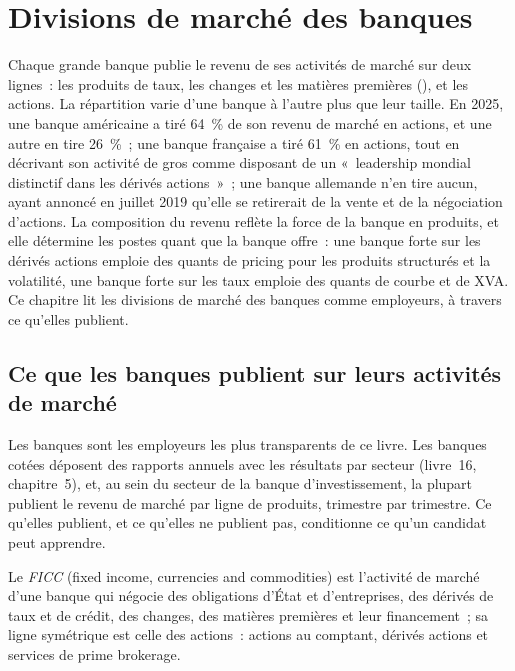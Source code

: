 \chapter{Divisions de marché des banques}\label{ch:in:bank-markets-divisions}

Chaque grande banque publie le revenu de ses activités de marché sur deux lignes~: les produits de taux, les changes et les matières premières (), et les actions.
La répartition varie d'une banque à l'autre plus que leur taille. En 2025, une banque américaine a tiré 64~\% de son revenu de marché en
actions, et une autre en tire 26~\%~; une banque française a tiré 61~\% en actions, tout en décrivant son activité de gros comme disposant de
un «~leadership mondial distinctif dans les dérivés actions~»~; une banque allemande n'en tire aucun, ayant annoncé en juillet 2019
qu'elle se retirerait de la vente et de la négociation d'actions. La composition du revenu reflète la force de la banque en produits, et elle détermine les postes quant que la banque offre~:
une banque forte sur les dérivés actions emploie des quants de pricing pour les produits structurés et la volatilité, une
banque forte sur les taux emploie des quants de courbe et de XVA. Ce chapitre lit les divisions de marché des banques comme employeurs, à travers ce qu'elles
publient.

\section{Ce que les banques publient sur leurs activités de marché}

Les banques sont les employeurs les plus transparents de ce livre. Les banques cotées déposent des rapports annuels avec les résultats par secteur
(livre~16, chapitre~5), et, au sein du secteur de la banque d'investissement, la plupart publient le revenu de marché par ligne de produits, trimestre par
trimestre. Ce qu'elles publient, et ce qu'elles ne publient pas, conditionne ce qu'un candidat peut apprendre.

\begin{definition}[FICC]\label{def:in:bank-markets-divisions:ficc}
Le \emph{FICC} (fixed income, currencies and commodities) est l'activité de marché d'une banque qui négocie
des obligations d'État et d'entreprises, des dérivés de taux et de crédit, des changes, des matières premières et leur
financement~; sa ligne symétrique est celle des actions~: actions au comptant, dérivés actions et services de prime brokerage.
\end{definition}

